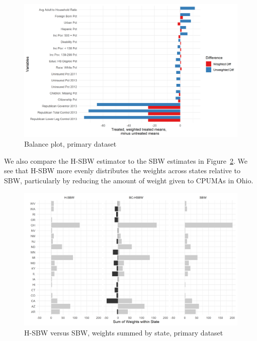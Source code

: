 \documentclass[article]{imsart}
\theoremstyle{plain}
\theoremstyle{remark}
\begin{document}
\begin{figure}[H]
\begin{center}
    \caption{Balance plot, primary dataset}
    \label{fig:loveplotc1}
    \includegraphics[scale=0.5]{01_Plots/balance-plot-etuc1.png}
\end{center}
\end{figure}

We also compare the H-SBW estimator to the SBW estimates in Figure~\ref{fig:sbwvhsbw1}. We see that H-SBW more evenly distributes the weights across states relative to SBW, particularly by reducing the amount of weight given to CPUMAs in Ohio. 

\begin{figure}[H]
\begin{center}
    \caption{H-SBW versus SBW, weights summed by state, primary dataset}
    \label{fig:sbwvhsbw1}
    \includegraphics[scale=0.6]{01_Plots/weights-by-state-sbw-hsbw-c1.png}
\end{center}
\end{figure}
\end{document}
